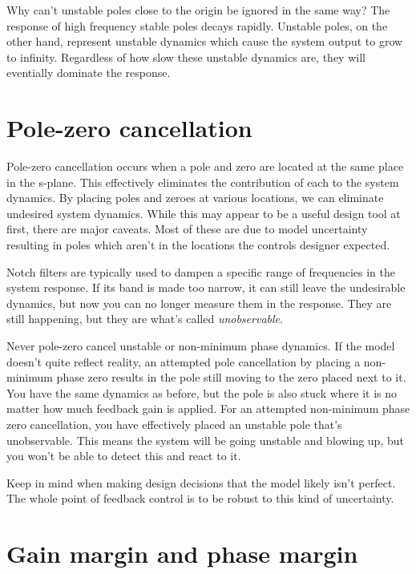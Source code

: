 Why can't unstable poles close to the origin be ignored in the same way? The
response of high frequency stable poles decays rapidly. Unstable poles, on the
other hand, represent unstable dynamics which cause the system output to grow to
infinity. Regardless of how slow these unstable dynamics are, they will
eventially dominate the response.

\section{Pole-zero cancellation}

Pole-zero cancellation occurs when a pole and zero are located at the same place
in the s-plane. This effectively eliminates the contribution of each to the
system dynamics. By placing poles and zeroes at various locations, we can
eliminate undesired system dynamics. While this may appear to be a useful design
tool at first, there are major caveats. Most of these are due to model
uncertainty resulting in poles which aren't in the locations the controls
designer expected.

Notch filters are typically used to dampen a specific range of frequencies in
the system response. If its band is made too narrow, it can still leave the
undesirable dynamics, but now you can no longer measure them in the response.
They are still happening, but they are what's called \textit{unobservable}.

Never pole-zero cancel unstable or non-minimum phase dynamics. If the model
doesn't quite reflect reality, an attempted pole cancellation by placing a
non-minimum phase zero results in the pole still moving to the zero placed next
to it. You have the same dynamics as before, but the pole is also stuck where it
is no matter how much feedback gain is applied. For an attempted non-minimum
phase zero cancellation, you have effectively placed an unstable pole that's
unobservable. This means the system will be going unstable and blowing up, but
you won't be able to detect this and react to it.

Keep in mind when making design decisions that the model likely isn't perfect.
The whole point of feedback control is to be robust to this kind of uncertainty.

\section{Gain margin and phase margin} \label{sec:gain-phase-margin}

